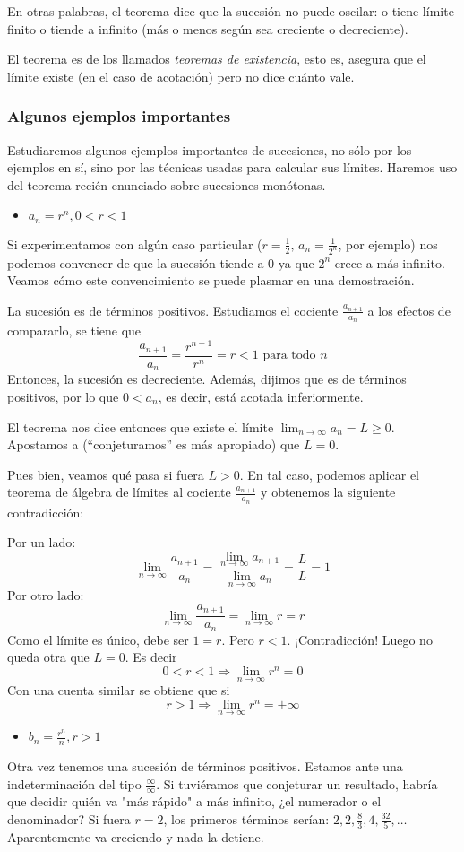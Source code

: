 \documentclass[../teoria.root.tex]{subfiles}
\begin{document}
En otras palabras, el teorema dice que la sucesión no puede oscilar:
o tiene límite finito o tiende a infinito (más o menos según sea creciente o decreciente).

El teorema es de los llamados \textit{teoremas de existencia}, esto es, asegura que el límite existe (en el caso de acotación) pero no dice cuánto vale.

\subsubsection{Algunos ejemplos importantes}
Estudiaremos algunos ejemplos importantes de sucesiones, no sólo por los ejemplos en sí, sino por las técnicas usadas para calcular sus límites.
Haremos uso del teorema recién enunciado sobre sucesiones monótonas.
\begin{itemize}
    \item \(a_n=r^n, 0<r<1\)
\end{itemize}
Si experimentamos con algún caso particular (\(r=\frac{1}{2},\,a_n=\frac{1}{2^n}\), por ejemplo) nos podemos convencer de que la sucesión tiende a 0 ya que \(2^n\) crece a más infinito.
Veamos cómo este convencimiento se puede plasmar en una demostración.

La sucesión es de términos positivos.
Estudiamos el cociente \(\frac{a_{n+1}}{a_n}\) a los efectos de compararlo, se tiene que
\[\frac{a_{n+1}}{a_n}=\frac{r^{n+1}}{r^n}=r<1\text{ para todo }n\]
Entonces, la sucesión es decreciente.
Además, dijimos que es de términos positivos, por lo que \(0<a_n\), es decir, está acotada inferiormente.

El teorema nos dice entonces que existe el límite \(\lim_{n\to\infty}a_n=L\geq0\).
Apostamos a (“conjeturamos” es más apropiado) que \(L=0\).

Pues bien, veamos qué pasa si fuera \(L>0\).
En tal caso, podemos aplicar el teorema de álgebra de límites al cociente \(\frac{a_{n+1}}{a_n}\) y obtenemos la siguiente contradicción:

Por un lado:
\[\lim_{n\to\infty}\frac{a_{n+1}}{a_n}=\frac{\lim_{n\to\infty}a_{n+1}}{\lim_{n\to\infty}a_n}=\frac{L}{L}=1\]
Por otro lado:
\[\lim_{n\to\infty}\frac{a_{n+1}}{a_n}=\lim_{n\to\infty}r=r\]
Como el límite es único, debe ser \(1=r\).
Pero \(r<1\).
¡Contradicción!
Luego no queda otra que \(L=0\).
Es decir
\[0<r<1\Rightarrow\lim_{n\to\infty}r^n=0\]
Con una cuenta similar se obtiene que si
\[r>1\Rightarrow\lim_{n\to\infty}r^n=+\infty\]
\begin{itemize}
    \item \(b_n=\frac{r^n}{n}, r>1\)
\end{itemize}
Otra vez tenemos una sucesión de términos positivos.
Estamos ante una indeterminación del tipo \(\frac{\infty}{\infty}\).
Si tuviéramos que conjeturar un resultado, habría que decidir quién va "más rápido" a más infinito, ¿el numerador o el denominador?
Si fuera \(r=2\), los primeros términos serían:
\(2,2,\frac{8}{3},4,\frac{32}{5},\dots\)
Aparentemente va creciendo y nada la detiene.
\end{document}
